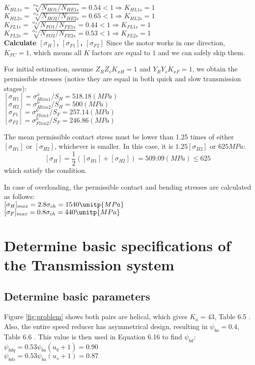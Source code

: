 $ K_{HL1s} = \sqrt[m_H]{N_{HO1}/N_{HE1s}} = 0.54 < 1 \Rightarrow K_{HL1s} = 1$\\
$ K_{HL2s} = \sqrt[m_H]{N_{HO2}/N_{HE2s}} = 0.65 < 1 \Rightarrow K_{HL2s} = 1$\\
$ K_{FL1s} = \sqrt[m_F]{N_{FO1}/N_{FE1s}} = 0.44 < 1 \Rightarrow K_{FL1s} = 1$\\
$ K_{FL2s} = \sqrt[m_F]{N_{FO2}/N_{FE2s}} = 0.53 < 1 \Rightarrow K_{FL2s} = 1$\\

\textbf{Calculate $ [{\sigma}_H] $, $ [{\sigma}_{F1}] $, $ [{\sigma}_{F2}] $}
Since the motor works in one direction, $ K_{FC} = 1$, which means all $ K $ factors are equal to $ 1 $ and we can safely skip them.

For initial estimation, assume $ Z_RZ_vK_{xH} = 1 $ and $ Y_RY_sK_{xF} = 1 $, we obtain the permissible stresses (notice they are equal in both quick and slow transmission stages):\\
$ [{\sigma}_{H1}] = \sigma_{Hlim1}^o/S_{H} = 518.18 \unit{(MPa)}$\\
$ [{\sigma}_{H2}] = \sigma_{Hlim2}^o/S_{H} = 500 \unit{(MPa)}$\\
$ [{\sigma}_{F1}] = \sigma_{Flim1}^o/S_{F} = 257.14\unit{(MPa)}$\\
$ [{\sigma}_{F2}] = \sigma_{Flim2}^o/S_{F} = 246.86 \unit{(MPa)}$

The mean permissible contact stress must be lower than 1.25 times of either $ [{\sigma}_{H1}] $ or $ [{\sigma}_{H2}] $, whichever is smaller. In this case, it is $ 1.25[{\sigma}_{H2}]$ or $ 625\unit{MPa} $:
\[[{\sigma}_{H}] =\dfrac{1}{2}\left( [{\sigma}_{H1}]+[{\sigma}_{H2}]\right)  = 509.09 \unit{(MPa)}\leq 625\]
which satisfy the condition.

In case of overloading, the permissible contact and bending stresses are calculated as follows:\\
$ [{\sigma}_H]_{max} = 2.8\sigma_{ch} = 1540\unitp{MPa} $\\
$ [{\sigma}_F]_{max} = 0.8\sigma_{ch} = 440\unitp{MPa} $

\section{Determine basic specifications of the Transmission system}

\subsection{Determine basic parameters}
Figure \ref{fig:problem} shows both pairs are helical, which  gives $ K_a = 43 $, Table 6.5 \cite{tk1}. Also, the entire speed reducer has asymmetrical design, resulting in $ \psi_{ba} = 0.4$, Table 6.6 \cite{tk1}. This value is then used in Equation 6.16 \cite{tk1} to find $ \psi_{bd} $:\\
$ \psi_{bdq} = 0.53\psi_{ba}(u_q+1) = 0.90 $\\
$ \psi_{bds} = 0.53\psi_{ba}(u_s+1) = 0.87 $

